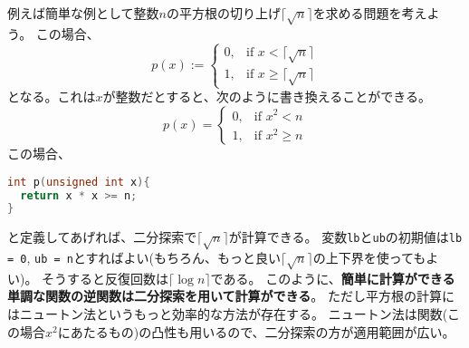 \documentclass[a4paper,twoside,onecolumn,openany,article,10pt]{memoir}
\theoremstyle{remark}
\begin{document}
例えば簡単な例として整数$n$の平方根の切り上げ$\lceil \sqrt{n}\rceil$を求める問題を考えよう。
この場合、
\begin{equation*}
p(x) :=
\begin{cases}
0,& \text{if } x < \lceil\sqrt{n}\rceil\\
1,& \text{if } x \ge \lceil\sqrt{n}\rceil
\end{cases}
\end{equation*}
となる。これは$x$が整数だとすると、次のように書き換えることができる。
\begin{equation*}
p(x) =
\begin{cases}
0,& \text{if } x^2 < n\\
1,& \text{if } x^2 \ge n
\end{cases}
\end{equation*}
この場合、
\begin{lstlisting}[basicstyle=\ttfamily\small,showstringspaces=false,language=C,frame=single]
int p(unsigned int x){
  return x * x >= n;
}
\end{lstlisting}
と定義してあげれば、二分探索で$\lceil \sqrt{n}\rceil$が計算できる。
変数\texttt{lb}と\texttt{ub}の初期値は\texttt{lb = 0}, \texttt{ub = n}とすればよい(もちろん、もっと良い$\lceil\sqrt{n}\rceil$の上下界を使ってもよい)。
そうすると反復回数は$\lceil\log n\rceil$である。
このように、\textbf{簡単に計算ができる単調な関数の逆関数は二分探索を用いて計算ができる}。
ただし平方根の計算にはニュートン法というもっと効率的な方法が存在する。
ニュートン法は関数(この場合$x^2$にあたるもの)の凸性も用いるので、二分探索の方が適用範囲が広い。
\end{document}
